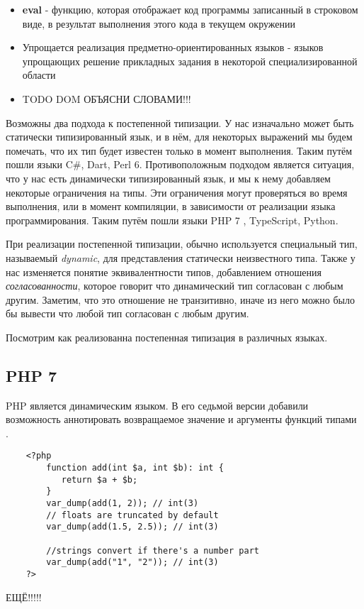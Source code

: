 \begin{itemize}
    \item \textbf{eval} - функцию, которая отображает код программы записанный в строковом виде, в результат выполнения этого кода в текущем окружении
    \item Упрощается реализация предметно-ориентированных языков - языков упрощающих решение прикладных задания в некоторой специализированной области
    \item TODO DOM  ОБЪЯСНИ СЛОВАМИ!!!
\end{itemize}
\cite{todo:TODO}

Возможны два подхода к постепенной типизации. У нас изначально может быть статически типизированный язык, и в нём, для некоторых выражений мы будем помечать, что их тип будет известен только в момент выполнения. Таким путём пошли языки C{\#}, Dart, Perl 6. Противоположным подходом является ситуация, что у нас есть динамически типизированный язык, и мы к нему добавляем некоторые ограничения на типы. Эти ограничения могут проверяться во время выполнения, или в момент компиляции, в зависимости от реализации языка программирования. Таким путём пошли языки PHP 7 , TypeScript, Python.

При реализации постепенной типизации, обычно используется специальный тип, называемый \textit{dynamic}, для представления статически неизвестного типа. Также у нас изменяется понятие эквивалентности типов, добавлением отношения \textit{согласованности}, которое говорит что динамический тип согласован с любым другим. Заметим, что это отношение не транзитивно, иначе из него можно было бы вывести что любой тип согласован с любым другим.

Посмотрим как реализованна постепенная типизация в различных языках.

\subsection{PHP 7}

PHP является динамическим языком. В его седьмой версии добавили возможность аннотировать возвращаемое значение и аргументы функций типами \cite{wiki:phpScalarTypeHints}.

\begin{verbatim}
    <?php        
        function add(int $a, int $b): int {
           return $a + $b;
        }
        var_dump(add(1, 2)); // int(3)
        // floats are truncated by default
        var_dump(add(1.5, 2.5)); // int(3)
 
        //strings convert if there's a number part
        var_dump(add("1", "2")); // int(3)
    ?>
\end{verbatim}
ЕЩЁ!!!!! \cite{todo:TODO}

